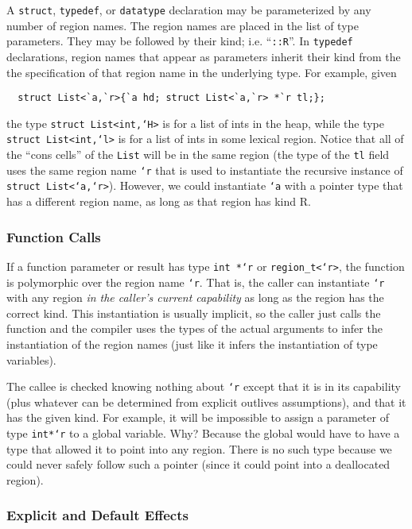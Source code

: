 A \texttt{struct}, \texttt{typedef}, or \texttt{datatype} declaration
may be parameterized by any number of region names.  The region names
are placed in the list of type parameters.  They may be followed by
their kind; i.e. ``\texttt{::R}''.  In \texttt{typedef} declarations,
region names that appear as parameters inherit their kind from the the
specification of that region name in the underlying type.  For
example, given
\begin{verbatim}
  struct List<`a,`r>{`a hd; struct List<`a,`r> *`r tl;};
\end{verbatim}
the type \texttt{struct List<int,`H>} is for a list of ints in the
heap, while the type \texttt{struct List<int,`l>} is for a list of
ints in some lexical region.  Notice that all of the ``cons cells'' of
the \texttt{List} will be in the same region (the type of the
\texttt{tl} field uses the same region name \texttt{`r} that is used
to instantiate the recursive instance of \texttt{struct List<`a,`r>}).
However, we could instantiate \texttt{`a} with a pointer type that has
a different region name, as long as that region has kind R.

\subsubsection{Function Calls}

If a function parameter or result has type \texttt{int *`r} or
\texttt{region\_t<`r>}, the function is polymorphic over the region name
\texttt{`r}.  That is, the caller can instantiate \texttt{`r} with any
region \emph{in the caller's current capability} as long as the region has
the correct kind. This instantiation is usually implicit, so the caller just
calls the function and the compiler uses the types of the actual arguments
to infer the instantiation of the region names (just like it infers the
instantiation of type variables).

The callee is checked knowing nothing about \texttt{`r} except that it is in
its capability (plus whatever can be determined from explicit outlives
assumptions), and that it has the given kind.  For example, it will be
impossible to assign a parameter of type \texttt{int*`r} to a global
variable.  Why?  Because the global would have to have a type that allowed
it to point into any region.  There is no such type because we could never
safely follow such a pointer (since it could point into a deallocated
region).

\subsubsection{Explicit and Default Effects}

